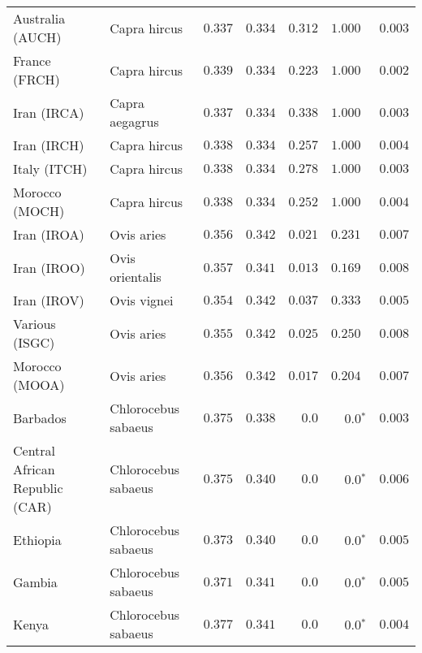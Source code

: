 \begin{center}
\begin{adjustbox}{width = 1\textwidth}
\begin{tabular}{|l|l|r|r|r|r|r|}
            Australia (AUCH)                    & Capra hircus      & $ 0.337$ & $ 0.334$ & $ 0.312$ & $ 1.000~~$        & $ 0.003$ \\
            France (FRCH)                    & Capra hircus        & $ 0.339$ & $ 0.334$ & $ 0.223$ & $ 1.000~~$        & $ 0.002$ \\
            Iran (IRCA)                   & Capra aegagrus        & $ 0.337$ & $ 0.334$ & $ 0.338$ & $ 1.000~~$        & $ 0.003$ \\
            Iran (IRCH)                 & Capra hircus        & $ 0.338$ & $ 0.334$ & $ 0.257$ & $ 1.000~~$        & $ 0.004$ \\
            Italy (ITCH)                    & Capra hircus          & $ 0.338$ & $ 0.334$ & $ 0.278$ & $ 1.000~~$        & $ 0.003$ \\
            Morocco (MOCH)                    & Capra hircus     & $ 0.338$ & $ 0.334$ & $ 0.252$ & $ 1.000~~$        & $ 0.004$ \\
            Iran (IROA)                    & Ovis aries         & $ 0.356$ & $ 0.342$ & $ 0.021$ & $ 0.231~~$        & $ 0.007$ \\
            Iran (IROO)                 & Ovis orientalis          & $ 0.357$ & $ 0.341$ & $ 0.013$ & $ 0.169~~$        & $ 0.008$ \\
            Iran (IROV)                 & Ovis vignei          & $ 0.354$ & $ 0.342$ & $ 0.037$ & $ 0.333~~$        & $ 0.005$ \\
            Various (ISGC)                       & Ovis aries & $ 0.355$ & $ 0.342$ & $ 0.025$    & $ 0.250~~$    & $ 0.008$ \\
            Morocco (MOOA) & Ovis aries & $ 0.356$ & $ 0.342$ & $ 0.017$    & $ 0.204~~$ & $ 0.007$ \\
            Barbados                       & Chlorocebus sabaeus & $ 0.375$ & $ 0.338$ & $0.0$    & $\bm{0.0{^*}}$    & $ 0.003$ \\
            Central African Republic (CAR)                         & Chlorocebus sabaeus & $ 0.375$ & $ 0.340$ & $0.0$    & $\bm{0.0{^*}}$    & $ 0.006$ \\
            Ethiopia                          & Chlorocebus sabaeus & $ 0.373$ & $ 0.340$ & $0.0$    & $\bm{0.0{^*}}$    & $ 0.005$ \\
            Gambia                          & Chlorocebus sabaeus & $ 0.371$ & $ 0.341$ & $0.0$    & $\bm{0.0{^*}}$    & $ 0.005$ \\
            Kenya              & Chlorocebus sabaeus & $ 0.377$ & $ 0.341$ & $0.0$    & $\bm{0.0{^*}}$    & $ 0.004$ \\

\end{tabular}
\end{adjustbox}
\end{center}
